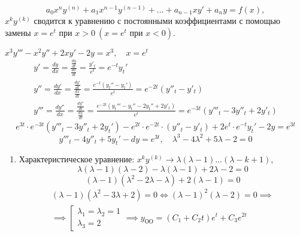 \begin{note}
    \[
        a_0 x^n y^{(n)} + a_1 x^{n-1}y^{(n-1)} + \ldots + a_{n-1}x y' + a_n y = f(x),
    \]
    $x^ky^{(k)}$ сводится к уравнению с постоянными коэффициентами с помощью замены $x = e^t$ при $x > 0 \ (x = e^t \text{ при }x < 0)$.
\end{note}

\begin{example}
    $x^3y''' - x^2 y'' + 2xy' - 2y = x^3, \quad x = e^t$
    \[
        \begin{array}{l}
            y' = \frac{dy}{dx} = \frac{\frac{dy}{dt}}{\frac{dx}{dt}} = \frac{y'_t}{e^t} = e^{-t}y_t'                             \\
            y'' = \frac{dy'}{dx} = \frac{\frac{dy'}{dt}}{\frac{dx}{dt}} = \frac{e^{-t}(y_t''-y_t')}{e^t} = e^{-2t}(y''_t - y'_t) \\
            y''' = \frac{dy''}{dx} = \frac{\frac{dy''}{dt}}{\frac{dx}{dt}} = \frac{e^{-2t}(y_t'''-y_t'' - 2y_t'' + 2y'_t)}{e^t} = e^{-3t}(y'''_t - 3y''_t + 2y'_t)
        \end{array}
    \]
    \[
        e^{3t}\cdot e^{-3t}(y'''_t - 3y''_t + 2y_t') - e^{2t}\cdot e^{-2t}\cdot (y''_t - y'_t) + 2e^t \cdot e^{-t}y_t' - 2y = e^{3t}
    \]
    \[
        y'''_t - 4y''_t + 5y_t' - dy = e^{3t}, \quad \lambda^3 - 4\lambda^2 + 5\lambda -2 = 0
    \]
    \begin{enumerate}
        \item Характеристическое уравнение: $x^ky^{(k)}\rightarrow \lambda(\lambda-1)\ldots(\lambda-k+1)$,
              \[
                  \lambda(\lambda - 1)(\lambda -2) - \lambda(\lambda-1)+ 2\lambda - 2 = 0
              \]
              \[
                  (\lambda-1)(\lambda^2 - 2\lambda - \lambda) + 2(\lambda -1) = 0
              \]
              \begin{multline*}
                  (\lambda - 1)(\lambda^2 - 3\lambda + 2) = 0 \iff (\lambda - 1)^2(\lambda - 2) = 0 \implies \\
                  \implies \left[\begin{array}{l}
                      \lambda_1 = \lambda_2 = 1 \\
                      \lambda_3 = 2
                  \end{array}\right. \implies y_{\text{ОО}} = (C_1 + C_2t)e^t + C_3 e^{2t}
              \end{multline*}


\end{enumerate}
\end{example}
